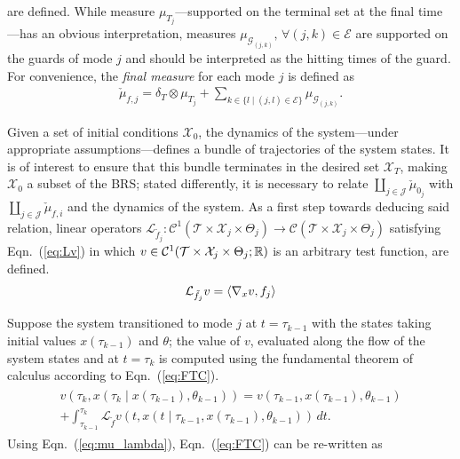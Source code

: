 are defined. While measure $\mu_{T_j}$---supported on the terminal set at the final time---has an obvious interpretation, measures $\mu_{\mathcal G_{(j,k)}},\,\forall (j,k)\in \mathcal E$ are supported on the guards of mode $j$ and should be interpreted as the hitting times of the guard.
For convenience, the {\em final measure} for each mode $j$ is defined as
\begin{align}
  \check\mu_{f,j}=\delta_T\otimes \mu_{T_j}+\sum_{k\in\{l\mid (j,l)\in \mathcal E\}}\mu_{\mathcal G_{(j,k)}}.
\label{eq:mu_T}
\end{align}
\normalsize
\par
Given a set of initial conditions $\mathcal X_{0}$, the dynamics of the system---under appropriate assumptions---defines a bundle of trajectories of the system states. It is of interest to ensure that this bundle terminates in the desired set $\mathcal X_T$, making $\mathcal X_0$ a subset of the BRS; stated differently, it is necessary to relate $\coprod_{j\in \mathcal J}\check\mu_{0_j}$ with $\coprod_{j\in \mathcal J}\check\mu_{f,i}$ and the dynamics of the system. As a first step towards deducing said relation, linear operators {$\mathcal L_{\tilde f_j}\colon \mathcal C^1(\mathcal T\times \mathcal X_j\times \Theta_j)\rightarrow \mathcal C(\mathcal T\times \mathcal X_j\times \Theta_j)$} satisfying Eqn.~(\ref{eq:Lv}) in which $v\in \mathcal C^1(\mathcal T\times \mathcal X_j\times \Theta_j;\mathbb{R})$ is an arbitrary test function, are defined.
\begin{align}
      \mathcal L_{\tilde f_j}v=\left\langle \nabla_x v,f_j\right\rangle
    \label{eq:Lv}
\end{align}
\par
Suppose the system transitioned to mode $j$ at \mbox{$t=\tau_{k-1}$} with the states taking initial values $x(\tau_{k-1})$ and $\theta$; the value of $v$, evaluated along the flow of the system states and at $t=\tau_{k}$ is computed using the fundamental theorem of calculus according to Eqn.~(\ref{eq:FTC}).
\begin{align}
\begin{split}
    v\left(\tau_k,x\left(\tau_{k}\mid x(\tau_{k-1}),\theta_{k-1}\right)\right)=v(\tau_{k-1},x(\tau_{k-1}),\theta_{k-1})\\
    +\int_{\tau_{k-1}}^{\tau_{k}}\mathcal L_{\tilde f}v(t,x(t\mid \tau_{k-1},x(\tau_{k-1}),\theta_{k-1}))\,dt.
\end{split}
\label{eq:FTC}
\end{align}
Using Eqn.~(\ref{eq:mu_lambda}), Eqn.~(\ref{eq:FTC}) can be re-written as

